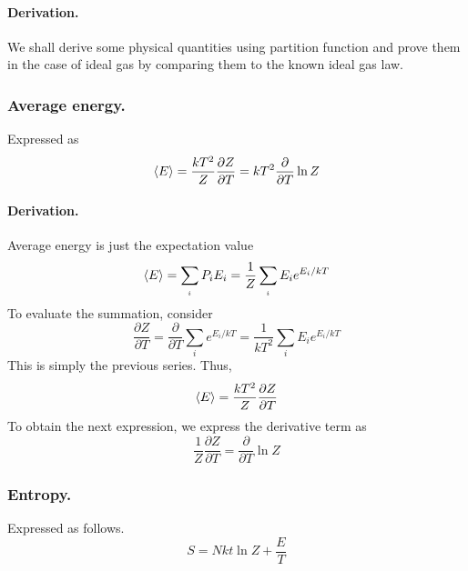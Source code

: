 \documentclass[../../../Main.tex]{subfiles}
\begin{document}
\paragraph*{Derivation.} We shall derive some physical quantities using partition function and prove them in the case of ideal gas by comparing them to the known ideal gas law. 
\subsubsection*{Average energy.} Expressed as
\begin{equation*}
    \braket{E}=\frac{kT^2}{Z}\frac{\partial Z}{\partial T}=kT^2\frac{\partial}{\partial T}\ln Z
\end{equation*}

\paragraph*{Derivation.} Average energy is just the expectation value
\begin{equation*}
    \braket{E}=\sum_{_i}P_iE_i=\frac{1}{Z}\sum_{_i}E_ie^{E_i/kT}
\end{equation*}
To evaluate the summation, consider
\begin{equation*}
    \frac{\partial Z}{\partial T}=\frac{\partial}{\partial T}\sum_i e^{E_i/kT}=\frac{1}{kT^2}\sum_i E_ie^{E_i/kT}
\end{equation*}
This is simply the previous series. Thus,
\begin{equation*}
    \braket{E}=\frac{kT^2}{Z}\frac{\partial Z}{\partial T}
\end{equation*}
To obtain the next expression, we express the derivative term as
\begin{equation*}
    \frac{1}{Z}\frac{\partial Z}{\partial T}=\frac{\partial }{\partial T}\ln Z
\end{equation*}

\subsubsection*{Entropy.} Expressed as follows.
\begin{equation*}
    S=Nkt\ln Z+\frac{E}{T}
\end{equation*}
\end{document}
